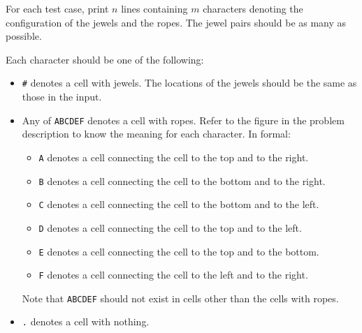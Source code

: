For each test case, print $n$ lines containing $m$ characters denoting the configuration of the jewels and the ropes.
The jewel pairs should be as many as possible.

Each character should be one of the following:
\begin{itemize}
\item \texttt{\#} denotes a cell with jewels. The locations of the jewels should be the same as those in the input.
\item Any of \texttt{ABCDEF} denotes a cell with ropes. Refer to the figure in the problem description to know the meaning for each character. In formal:
\begin{itemize}
    \item \texttt{A} denotes a cell connecting the cell to the top and to the right.
    \item \texttt{B} denotes a cell connecting the cell to the bottom and to the right.
    \item \texttt{C} denotes a cell connecting the cell to the bottom and to the left.
    \item \texttt{D} denotes a cell connecting the cell to the top and to the left.
    \item \texttt{E} denotes a cell connecting the cell to the top and to the bottom.
    \item \texttt{F} denotes a cell connecting the cell to the left and to the right.
\end{itemize}
Note that \texttt{ABCDEF} should not exist in cells other than the cells with ropes.
\item \texttt{.} denotes a cell with nothing.
\end{itemize}